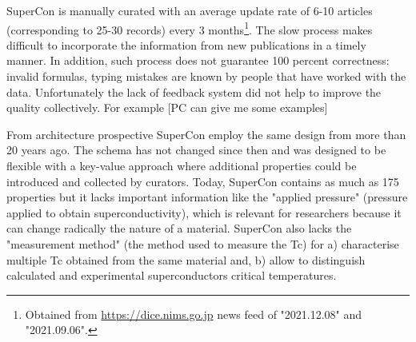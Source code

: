 \documentclass{article}
\begin{document}


SuperCon is manually curated with an average update rate of 6-10 articles (corresponding to 25-30 records) every 3 months\footnote{Obtained from \url{https://dice.nims.go.jp} news feed of "2021.12.08" and "2021.09.06".}. 
The slow process makes difficult to incorporate the information from new publications in a timely manner.
In addition, such process does not guarantee 100 percent correctness: invalid formulas, typing mistakes are known by people that have worked with the data. Unfortunately the lack of feedback system did not help to improve the quality collectively. 
For example [PC can give me some examples]

From architecture prospective SuperCon employ the same design from more than 20 years ago. The schema has not changed since then and was designed to be flexible with a key-value approach where additional properties could be introduced and collected by curators.
Today, SuperCon contains as much as 175 properties but it lacks important information like the "applied pressure" (pressure applied to obtain superconductivity), which is relevant for researchers because it can change radically the nature of a material. 
SuperCon also lacks the "measurement method" (the method used to measure the Tc) for a) characterise multiple Tc obtained from the same material and, b) allow to distinguish calculated and experimental superconductors critical temperatures. 
\end{document}
